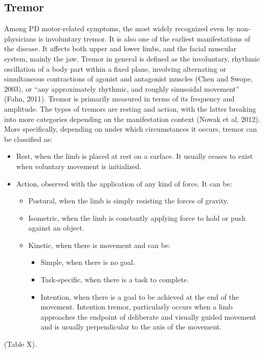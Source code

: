 \subsection{Tremor}
\label{subsec:tremor}
Among \gls{PD} motor-related symptoms, the most widely recognized even by non-physicians is involuntary tremor. It is also one of the earliest manifestations of the disease. It affects both upper and lower limbs, and the facial muscular system, mainly the jaw. Tremor in general is defined as the involuntary, rhythmic oscillation of a body part within a fixed plane, involving alternating or simultaneous contractions of agonist and antagonist muscles (Chen and Swope, 2003), or ``any approximately rhythmic, and roughly sinusoidal movement'' (Fahn, 2011). Tremor is primarily measured in terms of its frequency and amplitude. The types of tremors are resting and action, with the latter breaking into more categories depending on the manifestation context (Nowak et al, 2012). More specifically, depending on under which circumstances it occurs, tremor can be classified as:
\begin{itemize}
\item Rest, when the limb is placed at rest on a surface. It usually ceases to exist when voluntary movement is initialized.
\item Action, observed with the application of any kind of force. It can be:
\begin{itemize}
\item Postural, when the limb is simply resisting the forces of gravity.
\item Isometric, when the limb is constantly applying force to hold or push against an object.
\item Kinetic, when there is movement and can be:
\begin{itemize}
\item Simple, when there is no goal.
\item Task-specific, when there is a task to complete.
\item Intention, when there is a goal to be achieved at the end of the movement. Intention tremor, particularly occurs when a limb approaches the endpoint of deliberate and visually guided movement and is usually perpendicular to the axis of the movement.
\end{itemize}
\end{itemize}
\end{itemize}

(\textcolor{BurntOrange}{Table X}).

